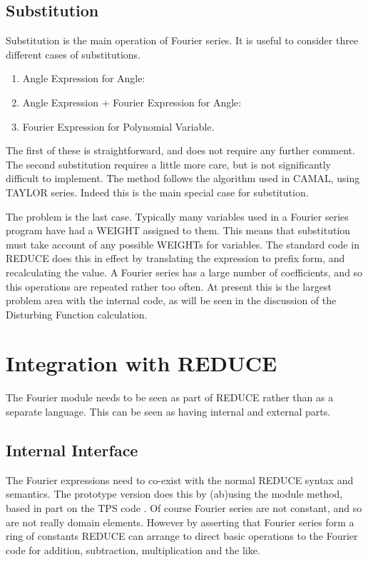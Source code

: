 \subsection{Substitution}

Substitution is the main operation of Fourier series.  It is useful to
consider three different cases of substitutions.
\begin{enumerate}
\item Angle Expression for Angle:
\item Angle Expression + Fourier Expression for Angle:
\item Fourier Expression for Polynomial Variable.
\end{enumerate}

The first of these is straightforward, and does not require any
further comment.  The second substitution requires a little more care,
but is not significantly difficult to implement.  The method follows
the algorithm used in CAMAL, using TAYLOR series.  Indeed this is the
main special case for substitution.

The problem is the last case.  Typically many variables used in a
Fourier series program have had a WEIGHT assigned to them.  This means
that substitution must take account of any possible WEIGHTs for
variables.  The standard code in REDUCE does this in effect by
translating the expression to prefix form, and recalculating the value.
A Fourier series has a large number of coefficients, and so this
operations are repeated rather too often.  At present this is the
largest problem area with the internal code, as will be seen in the
discussion of the Disturbing Function calculation.

\section{Integration with REDUCE}

The Fourier module needs to be seen as part of REDUCE rather than as a
separate language.  This can be seen as having internal and external
parts.

\subsection{Internal Interface}

The Fourier expressions need to co-exist with the normal REDUCE syntax
and semantics.  The prototype version does this by (ab)using the
module method, based in part on the TPS code \cite{Barnes}.  Of course
Fourier series are not constant, and so are not really domain
elements.  However by asserting that Fourier series form a ring of
constants REDUCE can arrange to direct basic operations to the Fourier
code for addition, subtraction, multiplication and the like.

